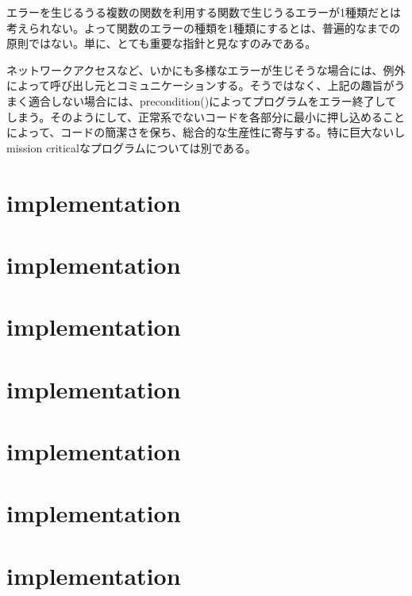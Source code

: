 \documentclass[uplatex,dvipdfmx]{jsarticle} \usepackage{amsmath,amssymb,bm}
\begin{document}
エラーを生じるうる複数の関数を利用する関数で生じうるエラーが1種類だとは考えられない。よって関数のエラーの種類を1種類にするとは、普遍的なまでの原則ではない。単に、とても重要な指針と見なすのみである。

ネットワークアクセスなど、いかにも多様なエラーが生じそうな場合には、例外によって呼び出し元とコミュニケーションする。そうではなく、上記の趣旨がうまく適合しない場合には、precondition()によってプログラムをエラー終了してしまう。そのようにして、正常系でないコードを各部分に最小に押し込めることによって、コードの簡潔さを保ち、総合的な生産性に寄与する。特に巨大ないしmission criticalなプログラムについては別である。


\section*{implementation}


\section*{implementation}


\section*{implementation}


\section*{implementation}


\section*{implementation}


\section*{implementation}


\section*{implementation}







\vspace{\baselineskip}
\begin{paracol}{2}
\switchcolumn
\end{paracol}
\end{document}
